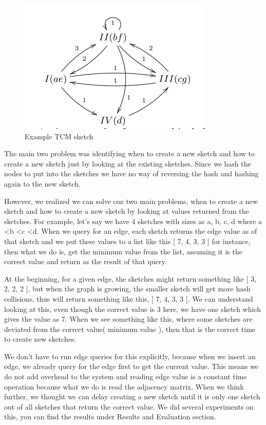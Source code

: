 \documentclass[conference]{IEEEtran}
\begin{document}
\begin{figure}[!t]
\centering
\includegraphics[width=0.8\linewidth]{example-tcm}
\caption{Example TCM sketch}
\label{fig:Example TCM sketch}
\end{figure} 


The main two problem was identifying when to create a new sketch and how to create a new sketch just by looking at the existing sketches. Since we hash the nodes to put into the sketches we have no way of reversing the hash and hashing again to the new sketch.


However, we realized we can solve our two main problems, when to create a new sketch and how to create a new sketch by looking at values returned from the sketches. For example, let's say we have 4 sketches with sizes as a, b, c, d where a \textless  b \textless c \textless d. When we query for an edge, each sketch returns the edge value as of that sketch and  we put these values to a list like this [ 7, 4, 3, 3 ] for instance, then what we do is, get the minimum value from the list, assuming it is the correct value and return as the result of that query.


At the beginning, for a given edge, the sketches might return something like [ 3, 2, 2, 2 ], but when the graph is growing, the smaller sketch will get more hash collisions, thus will return something like this, [ 7, 4, 3, 3  ]. We can understand looking at this, even though the correct value is 3 here, we have one sketch which gives the value as 7. When we see something like this, where some sketches are deviated from the correct value( minimum value ), then that is the correct time to create new sketches. 



We don't have to run edge queries for this explicitly, because when we insert an edge, we already query for the edge first to get the current value. This means we do not add overhead to the system and reading edge value is a constant time operation because what we do is read the adjacency matrix. When we think further, we thought we can delay creating a new sketch until it is only one sketch out of all sketches that return the correct value. We did several experiments on this, you can find the results under Results and Evaluation section.
\end{document}
